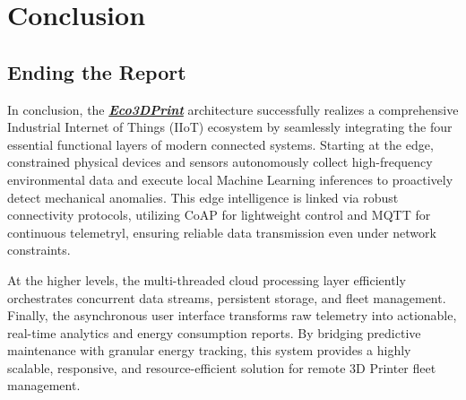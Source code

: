 \chapter{Conclusion}
\section{Ending the Report}
In conclusion, the \textbf{\textit{\underline{Eco3DPrint}}} architecture successfully realizes a comprehensive Industrial Internet of Things (IIoT) ecosystem by seamlessly integrating the four essential functional layers of modern connected systems. Starting at the edge, constrained physical devices and sensors autonomously collect high-frequency environmental data and execute local Machine Learning inferences to proactively detect mechanical anomalies. This edge intelligence is linked via robust connectivity protocols, utilizing CoAP for lightweight control and MQTT for continuous telemetryl, ensuring reliable data transmission even under network constraints. 

\medspace

At the higher levels, the multi-threaded cloud processing layer efficiently orchestrates concurrent data streams, persistent storage, and fleet management. Finally, the asynchronous user interface transforms raw telemetry into actionable, real-time analytics and energy consumption reports. By bridging predictive maintenance with granular energy tracking, this system provides a highly scalable, responsive, and resource-efficient solution for remote 3D Printer fleet management. 

